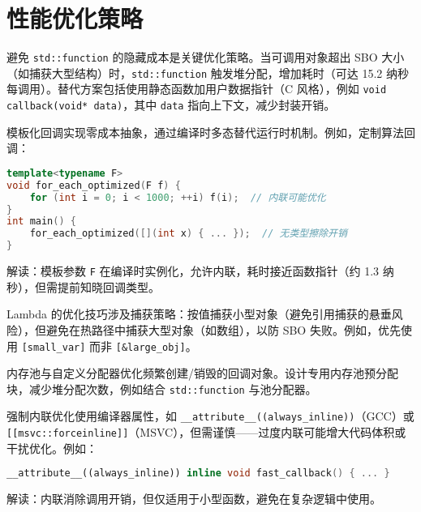 \chapter{性能优化策略}
避免 \texttt{std::function} 的隐藏成本是关键优化策略。当可调用对象超出 SBO 大小（如捕获大型结构）时，\texttt{std::function} 触发堆分配，增加耗时（可达 15.2 纳秒每调用）。替代方案包括使用静态函数加用户数据指针（C 风格），例如 \texttt{void callback(void* data)}，其中 \texttt{data} 指向上下文，减少封装开销。\par
模板化回调实现零成本抽象，通过编译时多态替代运行时机制。例如，定制算法回调：\par
\begin{lstlisting}[language=cpp]
template<typename F>  
void for_each_optimized(F f) {  
    for (int i = 0; i < 1000; ++i) f(i);  // 内联可能优化  
}  
int main() {  
    for_each_optimized([](int x) { ... });  // 无类型擦除开销  
}  
\end{lstlisting}
解读：模板参数 \texttt{F} 在编译时实例化，允许内联，耗时接近函数指针（约 1.3 纳秒），但需提前知晓回调类型。\par
Lambda 的优化技巧涉及捕获策略：按值捕获小型对象（避免引用捕获的悬垂风险），但避免在热路径中捕获大型对象（如数组），以防 SBO 失败。例如，优先使用 \texttt{[small\_{}var]} 而非 \texttt{[\&{}large\_{}obj]}。\par
内存池与自定义分配器优化频繁创建/销毁的回调对象。设计专用内存池预分配块，减少堆分配次数，例如结合 \texttt{std::function} 与池分配器。\par
强制内联优化使用编译器属性，如 \texttt{\_{}\_{}attribute\_{}\_{}((always\_{}inline))}（GCC）或 \texttt{[[msvc::forceinline]]}（MSVC），但需谨慎——过度内联可能增大代码体积或干扰优化。例如：\par
\begin{lstlisting}[language=cpp]
__attribute__((always_inline)) inline void fast_callback() { ... }  
\end{lstlisting}
解读：内联消除调用开销，但仅适用于小型函数，避免在复杂逻辑中使用。\par
